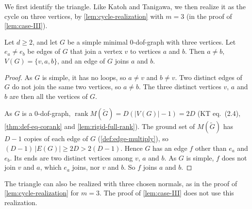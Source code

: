 We first identify the triangle. Like Katoh and Tanigawa, we then
realize it as the cycle on three vertices, by
\cref{lem:cycle-realization} with $m = 3$ (in the proof of
\cref{lem:case-III}).

\begin{lemma}
  \label{lem:triangle-third-edge}
  \leanok
  Let $d \ge 2$, and let $G$ be a simple minimal $0$-dof-graph with
  three vertices. Let $e_a \neq e_b$ be edges of $G$ that join a vertex
  $v$ to vertices $a$ and $b$. Then $a \neq b$, $V(G) = \{v, a, b\}$,
  and an edge of $G$ joins $a$ and $b$.
\end{lemma}
\begin{proof}
  \leanok
  As $G$ is simple, it has no loops, so $a \neq v$ and $b \neq v$. Two
  distinct edges of $G$ do not join the same two vertices, so
  $a \neq b$. The three distinct vertices $v$, $a$ and $b$ are then all
  the vertices of $G$.

  As $G$ is a $0$-dof-graph,
  $\operatorname{rank} M(\tilde G) = D(|V(G)| - 1) = 2D$ (KT
  eq.~(2.4), \cref{thm:def-eq-corank} and \cref{lem:rigid-full-rank}).
  The ground set of $M(\tilde G)$ has $D - 1$ copies of each edge of $G$
  (\cref{def:edge-multiply}), so $(D - 1)\,|E(G)| \ge 2D > 2(D - 1)$.
  Hence $G$ has an edge $f$ other than $e_a$ and $e_b$. Its ends are two
  distinct vertices among $v$, $a$ and $b$. As $G$ is simple, $f$ does
  not join $v$ and $a$, which $e_a$ joins, nor $v$ and $b$. So $f$ joins
  $a$ and $b$.
\end{proof}

The triangle can also be realized with three chosen normals, as in the
proof of \cref{lem:cycle-realization} for $m = 3$. The proof of
\cref{lem:case-III} does not use this realization.

